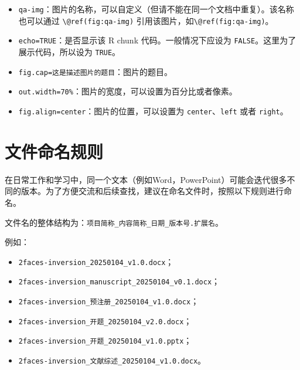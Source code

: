 \documentclass[]{ctexbook}
\providecommand{\tightlist}{%
  \setlength{\itemsep}{0pt}\setlength{\parskip}{0pt}}
\theoremstyle{definition}
\theoremstyle{definition}
\theoremstyle{definition}
\theoremstyle{definition}
\theoremstyle{remark}
\begin{document}
\begin{itemize}
\tightlist
\item
  \texttt{qa-img}：图片的名称，可以自定义（但请不能在同一个文档中重复）。该名称也可以通过 \texttt{\textbackslash{}@ref(fig:qa-img)} 引用该图片，如\texttt{\textbackslash{}@ref(fig:qa-img)}。
\item
  \texttt{echo=TRUE}：是否显示该 R chunk 代码。一般情况下应设为 \texttt{FALSE}。这里为了展示代码，所以设为 \texttt{TRUE}。
\item
  \texttt{fig.cap=\textquotesingle{}这是描述图片的题目\textquotesingle{}}：图片的题目。
\item
  \texttt{out.width=\textquotesingle{}70\%\textquotesingle{}}：图片的宽度，可以设置为百分比或者像素。
\item
  \texttt{fig.align=\textquotesingle{}center\textquotesingle{}}：图片的位置，可以设置为 \texttt{center}、\texttt{left} 或者 \texttt{right}。
\end{itemize}

\chapter{文件命名规则}\label{naming}

在日常工作和学习中，同一个文本（例如Word，PowerPoint）可能会迭代很多不同的版本。为了方便交流和后续查找，建议在命名文件时，按照以下规则进行命名。

文件名的整体结构为：\texttt{项目简称\_内容简称\_日期\_版本号.扩展名}。

例如：

\begin{itemize}
\tightlist
\item
  \texttt{2faces-inversion\_20250104\_v1.0.docx}；\\
\item
  \texttt{2faces-inversion\_manuscript\_20250104\_v0.1.docx}；\\
\item
  \texttt{2faces-inversion\_预注册\_20250104\_v1.0.docx}；\\
\item
  \texttt{2faces-inversion\_开题\_20250104\_v2.0.docx}；\\
\item
  \texttt{2faces-inversion\_开题\_20250104\_v1.0.pptx}；\\
\item
  \texttt{2faces-inversion\_文献综述\_20250104\_v1.0.docx}。
\end{itemize}
\end{document}
